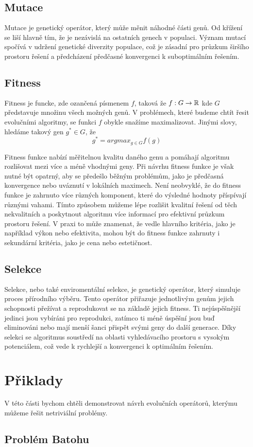 \subsection{Mutace}
Mutace je genetický operátor, který může měnit náhodné části genů. Od křížení se liší hlavně tím, že je nezávislá na ostatních genech v populaci. Význam mutací spočívá v udržení genetické diverzity populace, což je zásadní pro průzkum širšího prostoru řešení a předcházení předčasné konvergenci k suboptimálním řešením.

\subsection{Fitness}
Fitness je funcke, zde ozančená písmenem $f$, taková že $f: G \rightarrow \mathbb{R}$ kde $G$ představuje množinu všech možných genů. V problémech, které budeme chtít řesit evolučními algoritmy, se funkci $f$ obykle snažíme maximalizovat. Jinými slovy, hledáme takový gen $g^* \in G$, že 
$$g^* = argmax_{g \in G} f(g)$$

Fitness funkce nabízí měřitelnou kvalitu daného genu a pomáhají algoritmu rozlišovat mezi více a méně vhodnými geny. Při návrhu fitness funkce je však nutné být opatrný, aby se předešlo běžným problémům, jako je předčasná konvergence nebo uváznutí v lokálních maximech. Není neobvyklé, že do fitness funkce je zahrnuto více různých komponent, které do výsledné hodnoty příspívají různými vahami. Tímto způsobem můžeme lépe rozlišit kvalitní řešení od těch nekvalitních a poskytnout algoritmu více informací pro efektivní průzkum prostoru řešení. V praxi to může znamenat, že vedle hlavního kritéria, jako je například výkon nebo efektivita, mohou být do fitness funkce zahrnuty i sekundární kritéria, jako je cena nebo estetičnost.

\subsection{Selekce}
Selekce, nebo také enviromentální selekce, je genetický operátor, který simuluje proces přírodního výběru. Tento operátor přiřazuje jednotlivým genům jejich schopnosti přežívat a reprodukovat se na základě jejich fitness. Ti nejúspěšnější jedinci jsou vybíráni pro reprodukci, zatímco ti méně úspěšní jsou buď eliminováni nebo mají menší šanci přispět svými geny do další generace. Díky selekci se algoritmus soustředí na oblasti vyhledávacího prostoru s vysokým potenciálem, což vede k rychlejší a konvergenci k optimálním řešením. 

\section{Přiklady}

V této části bychom chtěli demonstrovat návrh evolučních operátorů, kterýmu můžeme řešit netriviální problémy.

\subsection{Problém Batohu}





